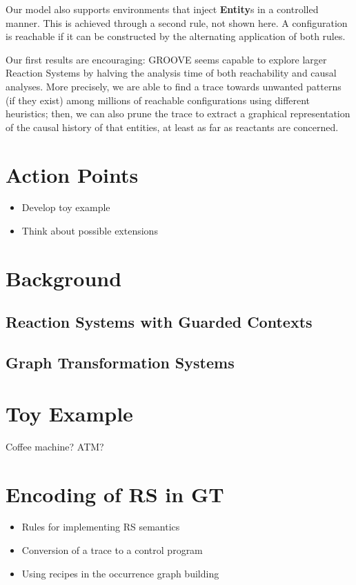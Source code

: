 \documentclass[sn-mathphys-num,a4paper,iicol,lineno,pdflatex]{sn-jnl-hacked}
\newcommand{\lab}[1]{\textsf{#1}}
\newcommand{\blab}[1]{\lab{\bfseries #1}}
\theoremstyle{thmstyleone}%
\theoremstyle{thmstyletwo}%
\theoremstyle{thmstylethree}%
\begin{document}
Our model also supports environments that inject \blab{Entity}s in a controlled manner. This is achieved through a second rule, not shown here. A configuration is reachable if it can be constructed by the alternating application of both rules.

\medskip\noindent
Our first results are encouraging: GROOVE seems capable to explore larger Reaction Systems 
by halving the analysis time of both reachability and causal analyses.
More precisely, we are able to find a trace towards unwanted patterns (if they exist) among millions of reachable configurations using different heuristics; then, we can also prune the trace to extract a graphical representation of the causal history of that entities, at least as far as reactants are concerned.

\section{Action Points}
\begin{itemize}
\item Develop toy example
\item Think about possible extensions
\end{itemize}


\section{Background}

\subsection{Reaction Systems with Guarded Contexts}
\subsection{Graph Transformation Systems}

\section{Toy Example}

Coffee machine? ATM?

\section{Encoding of RS in GT}
\begin{itemize}
\item Rules for implementing RS semantics
\item Conversion of a trace to a control program
\item Using recipes in the occurrence graph building
\end{itemize}
\end{document}
